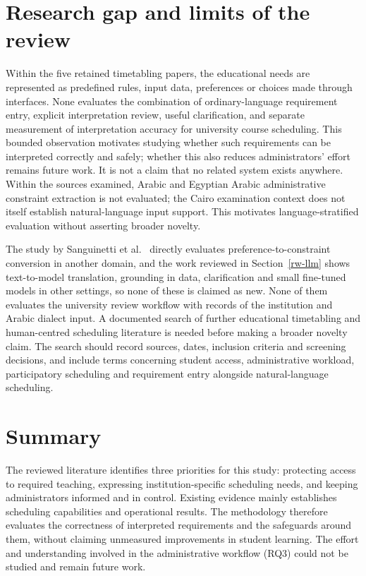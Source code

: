 \section{Research gap and limits of the review}
Within the five retained timetabling papers, the educational needs are represented as predefined rules, input data, preferences or choices made through interfaces. None evaluates the combination of ordinary-language requirement entry, explicit interpretation review, useful clarification, and separate measurement of interpretation accuracy for university course scheduling. This bounded observation motivates studying whether such requirements can be interpreted correctly and safely; whether this also reduces administrators' effort remains future work. It is not a claim that no related system exists anywhere. Within the sources examined, Arabic and Egyptian Arabic administrative constraint extraction is not evaluated; the Cairo examination context does not itself establish natural-language input support. This motivates language-stratified evaluation without asserting broader novelty.

The study by Sanguinetti et al.~\cite{sanguinetti2025preferences} directly evaluates preference-to-constraint conversion in another domain, and the work reviewed in Section~\ref{rw-llm} shows text-to-model translation, grounding in data, clarification and small fine-tuned models in other settings, so none of these is claimed as new. None of them evaluates the university review workflow with records of the institution and Arabic dialect input. A documented search of further educational timetabling and human-centred scheduling literature is needed before making a broader novelty claim. The search should record sources, dates, inclusion criteria and screening decisions, and include terms concerning student access, administrative workload, participatory scheduling and requirement entry alongside natural-language scheduling.

\section{Summary}
The reviewed literature identifies three priorities for this study: protecting access to required teaching, expressing institution-specific scheduling needs, and keeping administrators informed and in control. Existing evidence mainly establishes scheduling capabilities and operational results. The methodology therefore evaluates the correctness of interpreted requirements and the safeguards around them, without claiming unmeasured improvements in student learning. The effort and understanding involved in the administrative workflow (RQ3) could not be studied and remain future work.
